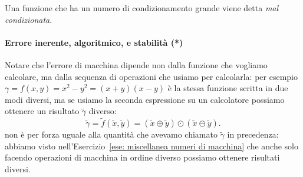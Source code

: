 \documentclass[a4paper]{report}
\theoremstyle{definiton}
\theoremstyle{remark}
\begin{document}
Una funzione che ha un numero di condizionamento grande viene detta \emph{mal condizionata}.

\paragraph{Errore inerente, algoritmico, e stabilità (*)}
Notare che l'errore di macchina dipende non dalla funzione che vogliamo calcolare, ma dalla sequenza di operazioni che usiamo per calcolarla: per esempio $\gamma = f(x,y) = x^2-y^2 = (x+y)(x-y)$ è la stessa funzione scritta in due modi diversi, ma se usiamo la seconda espressione su un calcolatore possiamo ottenere un risultato $\tilde{\gamma}$ diverso:
\[
    \tilde{\gamma} = \tilde{f}(\tilde{x},\tilde{y}) = (\tilde{x}\oplus\tilde{y})\odot(\tilde{x}\ominus\tilde{y}).
\]
non è per forza uguale alla quantità che avevamo chiamato $\tilde{\gamma}$ in precedenza: abbiamo visto nell'Esercizio~\ref{ese: 
miscellanea numeri di macchina} che anche solo facendo operazioni di macchina in ordine diverso possiamo ottenere risultati diversi.
\end{document}
